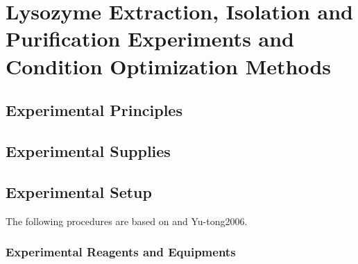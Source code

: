 % 
%
%
% 
%

\chapter{Lysozyme Extraction, Isolation and Purification Experiments and Condition Optimization Methods}

\section{Experimental Principles}









\section{Experimental Supplies}











\section{Experimental Setup}
The following procedures are based on \cite{Yijun2020,Li-li2017} and {Yu-tong2006}.

\subsection{Experimental Reagents and Equipments}

